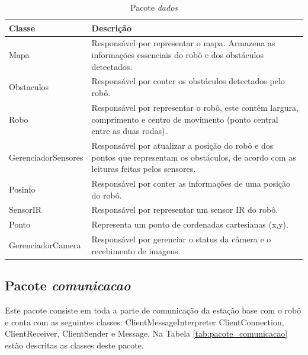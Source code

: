 \begin{table}[h]
  \centering
  \caption{Pacote \textit{dados}}
  \begin{tabular}{p{6cm}p{8cm}}
    \toprule
    \textbf{Classe} & \textbf{Descrição} \\ 
    \midrule
    Mapa  & Responsável por representar o mapa. Armazena as informações essenciais do robô e dos obstáculos detectados. \\ \hline
    Obstaculos & Responsável por conter os obstáculos detectados pelo robô. \\ \hline
    Robo  & Responsável por representar o robô, este contêm largura, comprimento e centro de movimento (ponto central entre as duas rodas). \\ \hline
    GerenciadorSensores & Responsável por atualizar a posição do robô e dos pontos que representam os obstáculos, de acordo com as leituras feitas pelos sensores. \\ \hline
    Posinfo & Responsável por conter as informações de uma posição do robô. \\ \hline
    SensorIR & Responsável por representar um sensor IR do robô. \\ \hline 
    Ponto & Representa um ponto de cordenadas cartesianas (x,y). \\ 
    GerenciadorCamera & Responsável por gerenciar o status da câmera e o recebimento de imagens. \\ 
    \bottomrule
  \end{tabular}%
  \label{tab:pacote_controle}%
\end{table}%

\subsection{Pacote \textit{comunicacao}}

Este pacote consiste em toda a parte de comunicação da estação base com o robô e conta com as seguintes classes: ClientMessageInterpreter ClientConnection, ClientReceiver, ClientSender e Message. Na Tabela \ref{tab:pacote_comunicacao} estão descritas as classes deste pacote.

